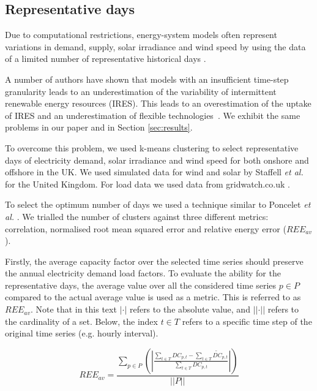 \documentclass[final,3p,times,twocolumn,numbers]{elsarticle}
\begin{document}
 
\subsection{Representative days}

Due to computational restrictions, energy-system models often represent variations in demand, supply, solar irradiance and wind speed by using the data of a limited number of representative historical days \cite{Poncelet2017}.

A number of authors have shown that models with an insufficient time-step granularity leads to an underestimation of the variability of intermittent renewable energy resources (IRES). This leads to an overestimation of the uptake of IRES and an underestimation of flexible technologies~\cite{Ludig2011,Haydt2011}. We exhibit the same problems in our paper \cite{Kell} and in Section \ref{sec:results}.

To overcome this problem, we used k-means clustering to select representative days of electricity demand, solar irradiance and wind speed for both onshore and offshore in the UK. We used simulated data for wind and solar by Staffell \textit{et al.} \cite{Staffell2016} for the United Kingdom. For load data we used data from gridwatch.co.uk \cite{gridwatch}.

To select the optimum number of days we used a technique similar to Poncelet \textit{et al.} \cite{Poncelet2017}. We trialled the number of clusters against three different metrics: correlation, normalised root mean squared error and relative energy error ($REE_{av}$).



Firstly, the average capacity factor over the selected time series should preserve the annual electricity demand load factors. To evaluate the ability for the representative days, the average value over all the considered time series $p\in P$ compared to the actual average value is used as a metric. This is referred to as $REE_{av}$. Note that in this text $\left|\cdot\right|$ refers to the absolute value, and $\left|\left|\cdot\right|\right|$ refers to the cardinality of a set. Below, the index $t\in T$ refers to a specific time step of the original time series (e.g. hourly interval).

\begin{equation}
	REE_{av}=\frac
	{\sum\limits_{p\in P}\left(\left|
	\frac
	{\sum\limits_{t\in T}DC_{p,t}-\sum\limits_{t\in T}\widetilde{DC}_{p,t}}
	{\sum\limits_{t\in T}DC_{p,t}}
	\right|\right)
	}
	{\left|\left|P\right|\right|}
\end{equation}
\end{document}
